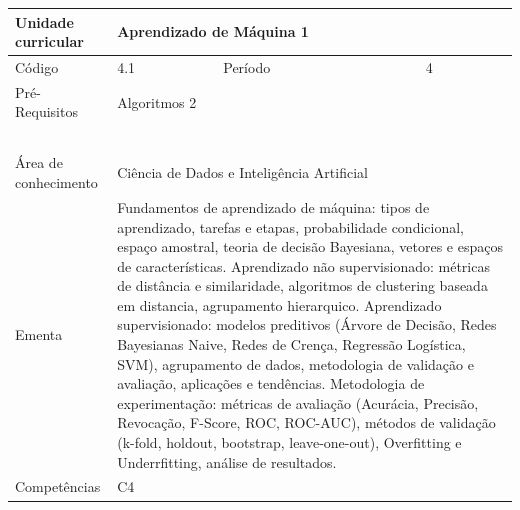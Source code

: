 \clearpage
\newpage

\begin{quadro}[ht!]
  \centering\scriptsize
\caption{Unidade Curricular Aprendizado de Máquina 1}

\begin{tabular}{|p{2.5cm}|p{2.5cm}|p{2.5cm}|p{2.5cm}|p{2.5cm}|}\hline

  Unidade curricular & \multicolumn{4}{p{10cm}|}{ Aprendizado de Máquina 1 }\\\hline
  Código & 4.1 & Período & \multicolumn{2}{p{5cm}|}{ 4 }\\\hline
  Pré-Requisitos & \multicolumn{4}{p{10cm}|}{ Algoritmos 2 } \\\hline
  \cellcolor{blue1}{ CH PRESENCIAL } &
    \cellcolor{blue1}{CH EAD Síncrona} &
    \cellcolor{blue1}{CH EAD Síncrona Mediada} &
    \cellcolor{blue1}{CH EAD Assíncrona} &
    \cellcolor{blue1}{CH APCC} \\\hline
  \cellcolor{blue1}{ 60 } &
    \cellcolor{blue1}{ 0 } &
    \cellcolor{blue1}{ 0 } &
    \cellcolor{blue1}{ 30 } &
    \cellcolor{blue1}{0} \\\hline
  \cellcolor{blue1}{ CH Teórica } &
    \cellcolor{blue1}{CH Prática} &
    \cellcolor{blue1}{CH Humanidades} &
    \cellcolor{blue1}{CH Extensão} &
    \cellcolor{blue1}{CH EAD TOTAL} \\\hline
  \cellcolor{blue1}{ 30 } &
    \cellcolor{blue1}{ 30 } &
    \cellcolor{blue1}{ 0 } &
    \cellcolor{blue1}{ 0 } &
    \cellcolor{blue1}{ 30 } \\\hline
  \cellcolor{blue1}{CARGA-HORÁRIA TOTAL} & \multicolumn{4}{p{10cm}|}{ \cellcolor{blue1}{ 90 } } \\\hline
  Área de conhecimento & \multicolumn{4}{p{10cm}|}{ Ciência de Dados e Inteligência Artificial } \\\hline
  Ementa & \multicolumn{4}{p{10cm}|}{ Fundamentos de aprendizado de máquina: tipos de aprendizado, tarefas e etapas, probabilidade condicional, espaço amostral, teoria de decisão Bayesiana, vetores e espaços de características. Aprendizado não supervisionado: métricas de distância e similaridade, algoritmos de clustering baseada em distancia, agrupamento hierarquico. Aprendizado supervisionado: modelos preditivos (Árvore de Decisão, Redes Bayesianas Naive, Redes de Crença, Regressão Logística, SVM), agrupamento de dados, metodologia de validação e avaliação, aplicações e tendências. Metodologia de experimentação: métricas de avaliação (Acurácia, Precisão, Revocação, F-Score, ROC, ROC-AUC), métodos de validação (k-fold, holdout, bootstrap, leave-one-out), Overfitting e Underrfitting, análise de resultados. } \\\hline
  Competências & \multicolumn{4}{p{10cm}|}{ C4 } \\\hline


  
	\end{tabular}

\end{quadro}


